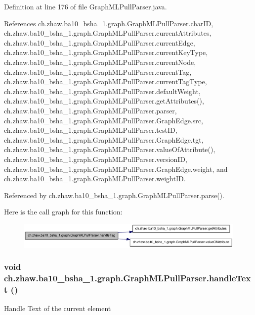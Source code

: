 Definition at line 176 of file GraphMLPullParser.java.

References ch.zhaw.ba10\_\-bsha\_\-1.graph.GraphMLPullParser.charID, ch.zhaw.ba10\_\-bsha\_\-1.graph.GraphMLPullParser.currentAttributes, ch.zhaw.ba10\_\-bsha\_\-1.graph.GraphMLPullParser.currentEdge, ch.zhaw.ba10\_\-bsha\_\-1.graph.GraphMLPullParser.currentKeyType, ch.zhaw.ba10\_\-bsha\_\-1.graph.GraphMLPullParser.currentNode, ch.zhaw.ba10\_\-bsha\_\-1.graph.GraphMLPullParser.currentTag, ch.zhaw.ba10\_\-bsha\_\-1.graph.GraphMLPullParser.currentTagType, ch.zhaw.ba10\_\-bsha\_\-1.graph.GraphMLPullParser.defaultWeight, ch.zhaw.ba10\_\-bsha\_\-1.graph.GraphMLPullParser.getAttributes(), ch.zhaw.ba10\_\-bsha\_\-1.graph.GraphMLPullParser.parser, ch.zhaw.ba10\_\-bsha\_\-1.graph.GraphMLPullParser.GraphEdge.src, ch.zhaw.ba10\_\-bsha\_\-1.graph.GraphMLPullParser.testID, ch.zhaw.ba10\_\-bsha\_\-1.graph.GraphMLPullParser.GraphEdge.tgt, ch.zhaw.ba10\_\-bsha\_\-1.graph.GraphMLPullParser.valueOfAttribute(), ch.zhaw.ba10\_\-bsha\_\-1.graph.GraphMLPullParser.versionID, ch.zhaw.ba10\_\-bsha\_\-1.graph.GraphMLPullParser.GraphEdge.weight, and ch.zhaw.ba10\_\-bsha\_\-1.graph.GraphMLPullParser.weightID.

Referenced by ch.zhaw.ba10\_\-bsha\_\-1.graph.GraphMLPullParser.parse().

Here is the call graph for this function:\nopagebreak
\begin{figure}[H]
\begin{center}
\leavevmode
\includegraphics[width=327pt]{classch_1_1zhaw_1_1ba10__bsha__1_1_1graph_1_1GraphMLPullParser_aa5ab79571da883a79a97faaed6886f51_cgraph}
\end{center}
\end{figure}
\hypertarget{classch_1_1zhaw_1_1ba10__bsha__1_1_1graph_1_1GraphMLPullParser_a06f1ee797fdd3fe07b3665cbaf3413d9}{
\subsubsection[{handleText}]{\setlength{\rightskip}{0pt plus 5cm}void ch.zhaw.ba10\_\-bsha\_\-1.graph.GraphMLPullParser.handleText ()}}
\label{classch_1_1zhaw_1_1ba10__bsha__1_1_1graph_1_1GraphMLPullParser_a06f1ee797fdd3fe07b3665cbaf3413d9}
Handle Text of the current element 

